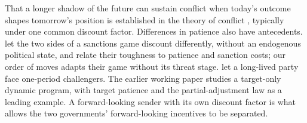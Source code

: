 \label{sec:literature}

 That a longer shadow of the future can sustain conflict when today's
outcome shapes tomorrow's position is established in the theory of conflict
\citep{SkaperdasSyropoulos1996,GarfinkelSkaperdas2000,Powell2012,KraininWiseman2016},
typically under one common discount factor. Differences in patience also have
antecedents. \citet{Eaton1992} let the two sides of a sanctions game discount
differently, without an endogenous political state, and relate their toughness
to patience and sanction costs; our order of moves adapts their game without its
threat stage. \citet[Appendix~B]{McBrideSkaperdas2009} let a long-lived party
face one-period challengers. The earlier working paper \citet{GongZhong2025}
studies a target-only dynamic program, with target patience and the
partial-adjustment law as a leading example. A forward-looking sender with its
own discount factor is what allows the two governments' forward-looking
incentives to be separated.

